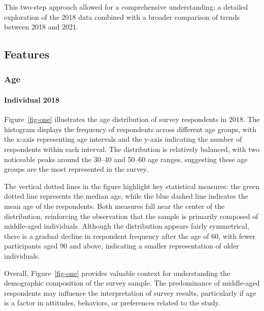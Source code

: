 \documentclass[
  letterpaper,
  DIV=11,
  numbers=noendperiod]{scrartcl}
\let\oldparagraph\paragraph
\renewcommand{\paragraph}[1]{\oldparagraph{#1}\mbox{}}
\begin{document}
This two-step approach allowed for a comprehensive understanding: a
detailed exploration of the 2018 data combined with a broader comparison
of trends between 2018 and 2021.

\subsection{Features}\label{features}

\subsubsection{Age}\label{age}

\paragraph{Individual 2018}\label{individual-2018}

Figure~\ref{fig-one} illustrates the age distribution of survey
respondents in 2018. The histogram displays the frequency of respondents
across different age groups, with the x-axis representing age intervals
and the y-axis indicating the number of respondents within each
interval. The distribution is relatively balanced, with two noticeable
peaks around the 30--40 and 50--60 age ranges, suggesting these age
groups are the most represented in the survey.

The vertical dotted lines in the figure highlight key statistical
measures: the green dotted line represents the median age, while the
blue dashed line indicates the mean age of the respondents. Both
measures fall near the center of the distribution, reinforcing the
observation that the sample is primarily composed of middle-aged
individuals. Although the distribution appears fairly symmetrical, there
is a gradual decline in respondent frequency after the age of 60, with
fewer participants aged 90 and above, indicating a smaller
representation of older individuals.

Overall, Figure~\ref{fig-one} provides valuable context for
understanding the demographic composition of the survey sample. The
predominance of middle-aged respondents may influence the interpretation
of survey results, particularly if age is a factor in attitudes,
behaviors, or preferences related to the study.
\end{document}
